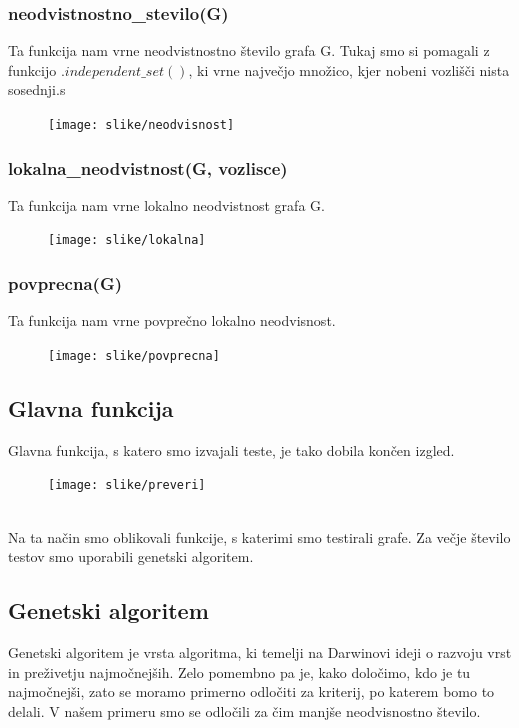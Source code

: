 \documentclass[12pt,a4paper]{amsart}
\theoremstyle{definition} %
\theoremstyle{plain} %
\begin{document}
\subsubsection{neodvistnostno\_stevilo(G)}
Ta funkcija nam vrne neodvistnostno število grafa G. Tukaj smo si pomagali z funkcijo $.independent\_set()$, ki vrne največjo množico, kjer nobeni vozlišči nista sosednji.s 
\begin{figure}[h!]
	\texttt{[image: slike/neodvisnost]}
\end{figure}

\subsubsection{lokalna\_neodvistnost(G, vozlisce)}
Ta funkcija nam vrne lokalno neodvistnost grafa G.
\begin{figure}[h!]
	\texttt{[image: slike/lokalna]}
\end{figure}

\subsubsection{povprecna(G)}
Ta funkcija nam vrne povprečno lokalno neodvisnost.
\begin{figure}[h!]
	\texttt{[image: slike/povprecna]}
\end{figure}
\subsection{Glavna funkcija}
Glavna funkcija, s katero smo izvajali teste, je tako dobila končen izgled.
\begin{figure}[h!]
	\texttt{[image: slike/preveri]}
\end{figure}
\ \\


Na ta način smo oblikovali funkcije, s katerimi smo testirali grafe. Za večje število testov smo uporabili genetski algoritem.
\subsection{Genetski algoritem}

Genetski algoritem je vrsta algoritma, ki temelji na Darwinovi ideji o razvoju vrst in preživetju najmočnejših. Zelo pomembno pa je, kako določimo, kdo je tu najmočnejši, zato se moramo primerno odločiti za kriterij, po katerem bomo to delali. V našem primeru smo se odločili za čim manjše neodvisnostno število.\\
\end{document}

